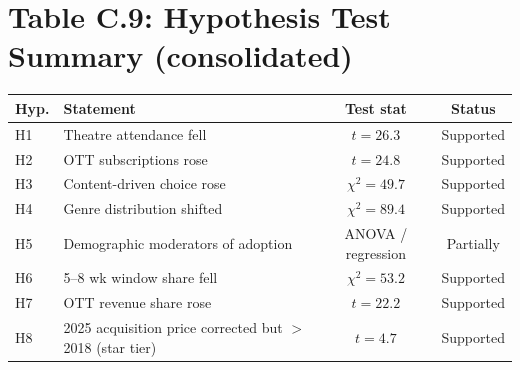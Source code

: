 \section{Table C.9: Hypothesis Test Summary (consolidated)}
\begin{tabularx}{\textwidth}{l X c c}
\toprule
\textbf{Hyp.} & \textbf{Statement} & \textbf{Test stat} &
\textbf{Status}\\
\midrule
H1 & Theatre attendance fell                    & $t=26.3$       & Supported \\
H2 & OTT subscriptions rose                     & $t=24.8$       & Supported \\
H3 & Content-driven choice rose                 & $\chi^{2}=49.7$ & Supported \\
H4 & Genre distribution shifted                 & $\chi^{2}=89.4$ & Supported \\
H5 & Demographic moderators of adoption         & ANOVA / regression & Partially \\
H6 & 5--8 wk window share fell                  & $\chi^{2}=53.2$ & Supported \\
H7 & OTT revenue share rose                     & $t=22.2$       & Supported \\
H8 & 2025 acquisition price corrected but $>$ 2018 (star tier) & $t=4.7$ & Supported \\
\bottomrule
\end{tabularx}

